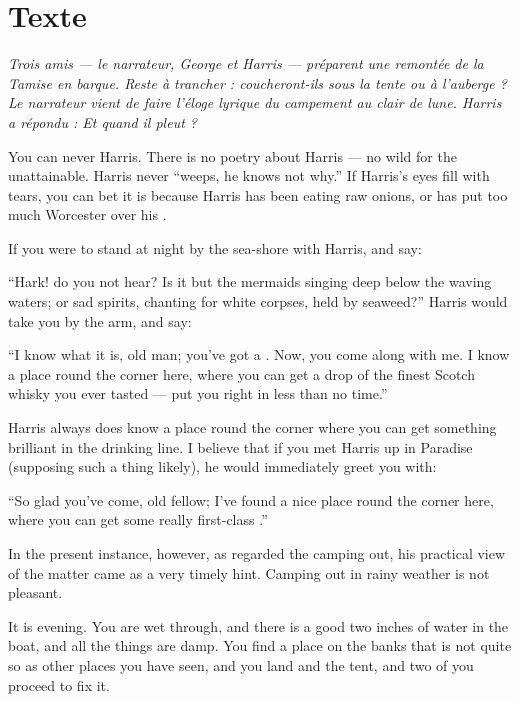 \documentclass{fiche}
\begin{document}
\newpage
\section{Texte}

\noindent\small\textit{Trois amis --- le narrateur, George et Harris --- préparent une
remontée de la Tamise en barque. Reste à trancher : coucheront-ils sous la tente ou à
l'auberge ? Le narrateur vient de faire l'éloge lyrique du campement au clair de lune.
Harris a répondu : \og Et quand il pleut ? \fg}\normalsize

\begin{texte}
You can never  Harris. There is no poetry about
Harris --- no wild  for the unattainable.
Harris never ``weeps, he knows not why.'' If Harris's eyes fill with tears, you can bet it is
because Harris has been eating raw onions, or has put too much Worcester over his
.

If you were to stand at night by the sea-shore with Harris, and say:

``Hark! do you not hear? Is it but the mermaids singing deep below the waving waters; or sad
spirits, chanting  for white corpses, held by
seaweed?'' Harris would take you by the arm, and say:

``I know what it is, old man; you've got a . Now, you
come along with me. I know a place round the corner here, where you can get a drop of the
finest Scotch whisky you ever tasted --- put you right in less than no time.''

Harris always does know a place round the corner where you can get something brilliant in the
drinking line. I believe that if you met Harris up in Paradise (supposing such a thing
likely), he would immediately greet you with:

``So glad you've come, old fellow; I've found a nice place round the corner here, where you
can get some really first-class .''

In the present instance, however, as regarded the camping out, his practical view of the
matter came as a very timely hint. Camping out in rainy weather is not pleasant.

It is evening. You are wet through, and there is a good two inches of water in the boat, and
all the things are damp. You find a place on the banks that is not quite so
 as other places you have seen, and you land and
 the tent, and two of you proceed to fix it.


\end{texte}
\end{document}
